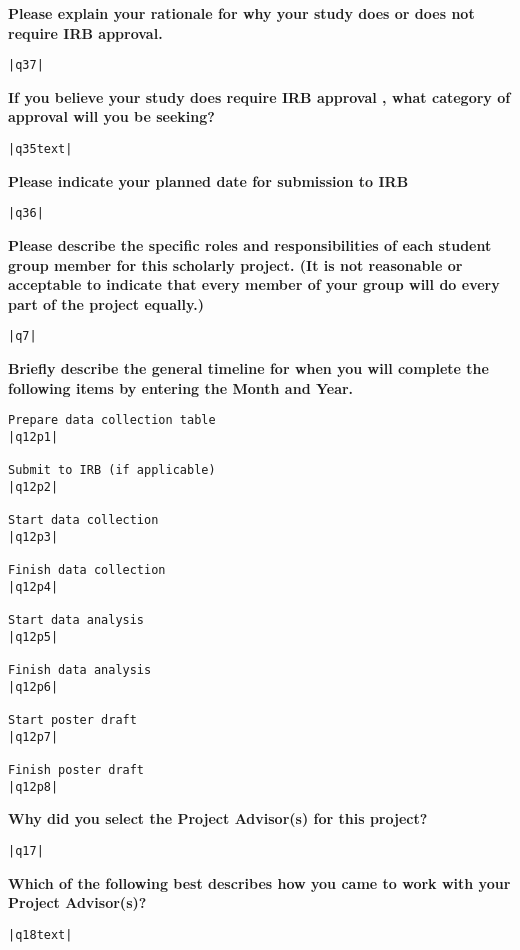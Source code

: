 \documentclass[11pt]{article}
\begin{document}
{\bfseries Please explain your rationale for why your study does or does not require IRB approval.}
\begin{lstlisting}[mathescape]
|q37|
\end{lstlisting}
\hfill

{\bfseries If you believe your study does require IRB approval , what category of approval will you be seeking?}
\begin{lstlisting}[mathescape]
|q35text|
\end{lstlisting}
\hfill

{\bfseries Please indicate your planned date for submission to IRB}
\begin{lstlisting}[mathescape]
|q36|
\end{lstlisting}
\hfill

{\bfseries Please describe the specific roles and responsibilities of each student group member for this scholarly project. (It is not reasonable or acceptable to indicate that every member of your group will do every part of the project equally.)}
\begin{lstlisting}[mathescape]
|q7|
\end{lstlisting}
\hfill

{\bfseries Briefly describe the general timeline for when you will complete the following items by entering the Month and Year.}
\begin{lstlisting}[mathescape]
Prepare data collection table
|q12p1|

Submit to IRB (if applicable)
|q12p2|

Start data collection
|q12p3|

Finish data collection
|q12p4|

Start data analysis
|q12p5|

Finish data analysis
|q12p6|

Start poster draft
|q12p7|

Finish poster draft
|q12p8|
\end{lstlisting}
\hfill

{\bfseries Why did you select the Project Advisor(s) for this project?}
\begin{lstlisting}[mathescape]
|q17|
\end{lstlisting}
\hfill

{\bfseries Which of the following best describes how you came to work with your Project Advisor(s)?}
\begin{lstlisting}[mathescape]
|q18text|
\end{lstlisting}
\hfill
\end{document}
